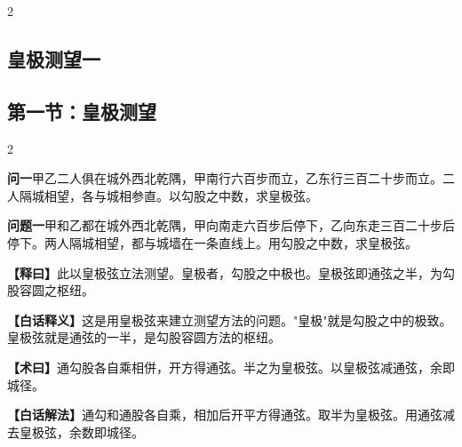 \documentclass[11pt,a4paper]{article}
\newcommand{\WenQuestion}[1]{\textbf{\textcolor{classicalcolor}{#1}}}
\newcommand{\BaiQuestion}[1]{\textbf{\textcolor{moderncolor}{#1}}}
\newcommand{\WenExplain}{\textcolor{classicalcolor}{\textbf{【释曰】}}}
\newcommand{\BaiExplain}{\textcolor{moderncolor}{\textbf{【白话释义】}}}
\newcommand{\WenMethod}{\textcolor{classicalcolor}{\textbf{【术曰】}}}
\newcommand{\BaiMethod}{\textcolor{moderncolor}{\textbf{【白话解法】}}}
\begin{document}
\vspace{0.5em}

\begin{paracol}{2}
\subsection*{\textcolor{sectioncolor}{皇极测望一}}
\switchcolumn
\subsection*{\textcolor{sectioncolor}{第一节：皇极测望}}
\end{paracol}

\vspace{0.5em}

\begin{paracol}{2}

\switchcolumn*
\begin{tcolorbox}[colback=red!3,colframe=red!30!black,boxrule=0.3pt]
\WenQuestion{问一}\quad 甲乙二人俱在城外西北乾隅，甲南行六百步而立，乙东行三百二十步而立。二人隔城相望，各与城相参直。以勾股之中数，求皇极弦。
\end{tcolorbox}
\switchcolumn
\begin{tcolorbox}[colback=blue!3,colframe=blue!30!black,boxrule=0.3pt]
\BaiQuestion{问题一}\quad 甲和乙都在城外西北乾隅，甲向南走六百步后停下，乙向东走三百二十步后停下。两人隔城相望，都与城墙在一条直线上。用勾股之中数，求皇极弦。
\end{tcolorbox}

\switchcolumn*
\begin{tcolorbox}[colback=red!5,colframe=red!30!black,boxrule=0.3pt]
\WenExplain\quad 此以皇极弦立法测望。皇极者，勾股之中极也。皇极弦即通弦之半，为勾股容圆之枢纽。
\end{tcolorbox}
\switchcolumn
\begin{tcolorbox}[colback=blue!5,colframe=blue!30!black,boxrule=0.3pt]
\BaiExplain\quad 这是用皇极弦来建立测望方法的问题。"皇极"就是勾股之中的极致。皇极弦就是通弦的一半，是勾股容圆方法的枢纽。
\end{tcolorbox}

\switchcolumn*
\begin{tcolorbox}[colback=red!5,colframe=red!40!black,boxrule=0.3pt]
\WenMethod\quad 通勾股各自乘相併，开方得通弦。半之为皇极弦。以皇极弦减通弦，余即城径。
\end{tcolorbox}
\switchcolumn
\begin{tcolorbox}[colback=blue!5,colframe=blue!40!black,boxrule=0.3pt]
\BaiMethod\quad 通勾和通股各自乘，相加后开平方得通弦。取半为皇极弦。用通弦减去皇极弦，余数即城径。
\end{tcolorbox}


\end{paracol}
\end{document}
